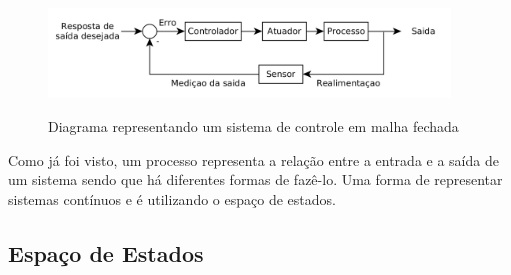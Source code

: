 \begin{figure}[!htb]
    \centering
    \caption{Diagrama representando um sistema de controle em malha fechada}
    \includegraphics[width=0.95\textwidth]{./04-figuras/fund_teorica/closed_loop_control_system}
    \label{fig:closed_loop_control_system}
\end{figure}

Como já foi visto, um processo representa a relação entre a entrada e a saída de um sistema sendo que há diferentes formas de fazê-lo. Uma forma de representar sistemas contínuos e é utilizando o espaço de estados.

%

\subsection{Espaço de Estados}
\label{subsec:fundamentacaoTeorica-ss}




